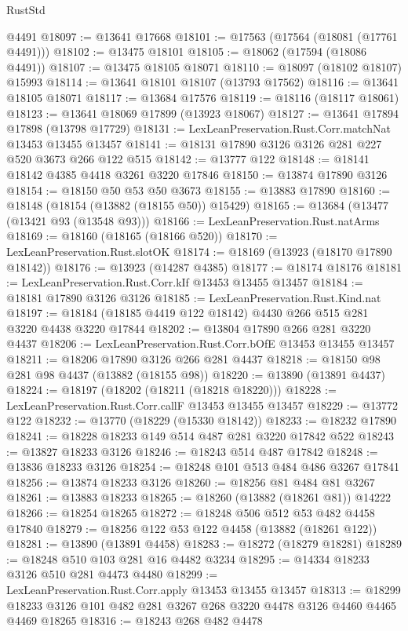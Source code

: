 \begin{lexlean}{RustStd}
\begin{coremodule}
    @4491
@18097 := @13641 @17668
@18101 := @17563 (@17564 (@18081 (@17761 @4491)))
@18102 := @13475 @18101
@18105 := @18062 (@17594 (@18086 @4491))
@18107 := @13475 @18105 @18071
@18110 := @18097 (@18102 @18107) @15993
@18114 := @13641 @18101 @18107 (@13793 @17562)
@18116 := @13641 @18105 @18071
@18117 := @13684 @17576
@18119 := @18116 (@18117 @18061)
@18123 := @13641 @18069 @17899 (@13923 @18067)
@18127 := @13641 @17894 @17898 (@13798 @17729)
@18131 := LexLeanPreservation.Rust.Corr.matchNat @13453 @13455 @13457
@18141 := @18131 @17890 @3126 @3126 @281 @227 @520 @3673 @266 @122 @515
@18142 := @13777 @122
@18148 := @18141 @18142 @4385 @4418 @3261 @3220 @17846
@18150 := @13874 @17890 @3126
@18154 := @18150 @50 @53 @50 @3673
@18155 := @13883 @17890
@18160 := @18148 (@18154 (@13882 (@18155 @50)) @15429)
@18165 := @13684 (@13477 (@13421 @93 (@13548 @93)))
@18166 := LexLeanPreservation.Rust.natArms
@18169 := @18160 (@18165 (@18166 @520))
@18170 := LexLeanPreservation.Rust.slotOK
@18174 := @18169 (@13923 (@18170 @17890 @18142))
@18176 := @13923 (@14287 @4385)
@18177 := @18174 @18176
@18181 := LexLeanPreservation.Rust.Corr.kIf @13453 @13455 @13457
@18184 := @18181 @17890 @3126 @3126
@18185 := LexLeanPreservation.Rust.Kind.nat
@18197 := @18184 (@18185 @4419 @122 @18142) @4430 @266 @515 @281 @3220 @4438 @3220 @17844
@18202 := @13804 @17890 @266 @281 @3220 @4437
@18206 := LexLeanPreservation.Rust.Corr.bOfE @13453 @13455 @13457
@18211 := @18206 @17890 @3126 @266 @281 @4437
@18218 := @18150 @98 @281 @98 @4437 (@13882 (@18155 @98))
@18220 := @13890 (@13891 @4437)
@18224 := @18197 (@18202 (@18211 (@18218 @18220)))
@18228 := LexLeanPreservation.Rust.Corr.callF @13453 @13455 @13457
@18229 := @13772 @122
@18232 := @13770 (@18229 (@15330 @18142))
@18233 := @18232 @17890
@18241 := @18228 @18233 @149 @514 @487 @281 @3220 @17842 @522
@18243 := @13827 @18233 @3126
@18246 := @18243 @514 @487 @17842
@18248 := @13836 @18233 @3126
@18254 := @18248 @101 @513 @484 @486 @3267 @17841
@18256 := @13874 @18233 @3126
@18260 := @18256 @81 @484 @81 @3267
@18261 := @13883 @18233
@18265 := @18260 (@13882 (@18261 @81)) @14222
@18266 := @18254 @18265
@18272 := @18248 @506 @512 @53 @482 @4458 @17840
@18279 := @18256 @122 @53 @122 @4458 (@13882 (@18261 @122))
@18281 := @13890 (@13891 @4458)
@18283 := @18272 (@18279 @18281)
@18289 := @18248 @510 @103 @281 @16 @4482 @3234
@18295 := @14334 @18233 @3126 @510 @281 @4473 @4480
@18299 := LexLeanPreservation.Rust.Corr.apply @13453 @13455 @13457
@18313 := @18299 @18233 @3126 @101 @482 @281 @3267 @268 @3220 @4478 @3126 @4460 @4465 @4469 @18265
@18316 := @18243 @268 @482 @4478

\end{coremodule}
\end{lexlean}
